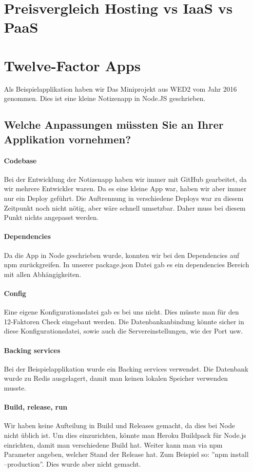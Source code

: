 \chapter{Preisvergleich Hosting vs IaaS vs PaaS}
\chapter{Twelve-Factor Apps}
Als Beispielapplikation haben wir Das Miniprojekt aus WED2 vom Jahr 2016 genommen. Dies ist eine kleine Notizenapp in Node.JS geschrieben.
\section{Welche Anpassungen müssten Sie an Ihrer Applikation vornehmen?}
\subsubsection{Codebase}
Bei der Entwicklung der Notizenapp haben wir immer mit GitHub gearbeitet, da wir mehrere Entwickler waren. Da es eine kleine App war, haben wir aber immer nur ein Deploy geführt. Die Auftrennung in verschiedene Deploys war zu diesem Zeitpunkt noch nicht nötig, aber wäre schnell umsetzbar. Daher muss bei diesem Punkt nichts angepasst werden. 
\subsubsection{Dependencies}
Da die App in Node geschrieben wurde, konnten wir bei den Dependencies auf npm zurückgreifen. In unserer package.json Datei gab es ein dependencies Bereich mit allen Abhängigkeiten.
\subsubsection{Config}
Eine eigene Konfigurationsdatei gab es bei uns nicht. Dies müsste man für den 12-Faktoren Check eingebaut werden. Die Datenbankanbindung könnte sicher in diese Konfigurationsdatei, sowie auch die Servereinstellungen, wie der Port usw.
\subsubsection{Backing services}
Bei der Beispielapplikation wurde ein Backing services verwendet. Die Datenbank wurde zu Redis ausgelagert, damit man keinen lokalen Speicher verwenden musste. 
\subsubsection{Build, release, run}
Wir haben keine Aufteilung in Build und Releases gemacht, da dies bei Node nicht üblich ist. Um dies einzurichten, könnte man Heroku Buildpack für Node.js einrichten, damit man verschiedene Build hat. Weiter kann man via npm Parameter angeben, welcher Stand der Release hat. Zum Beispiel so: ''npm install --production''. Dies wurde aber nicht gemacht.
